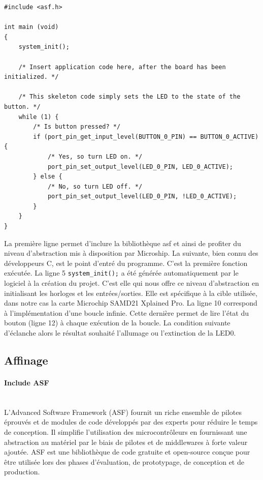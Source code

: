 \documentclass[a4paper]{article}
\begin{document}
\begin{lstlisting}[style=CStyle]
#include <asf.h>

int main (void)
{
	system_init();
	
	/* Insert application code here, after the board has been initialized. */
	
	/* This skeleton code simply sets the LED to the state of the button. */
	while (1) {
		/* Is button pressed? */
		if (port_pin_get_input_level(BUTTON_0_PIN) == BUTTON_0_ACTIVE) {
			/* Yes, so turn LED on. */
			port_pin_set_output_level(LED_0_PIN, LED_0_ACTIVE);
		} else {
			/* No, so turn LED off. */
			port_pin_set_output_level(LED_0_PIN, !LED_0_ACTIVE);
		}
	}
}
\end{lstlisting}
La première ligne permet d'inclure la  bibliothèque asf et ainsi de profiter du niveau d'abstraction mis à disposition par Microship. La suivante, bien connu des développeurs C, est le point d'entré du programme. C'est la première fonction exécutée. La ligne 5 \texttt{system\_init();} a été générée automatiquement par le logiciel à la création du projet. C'est elle qui nous offre ce niveau d'abstraction en initialisant les horloges et les entrées/sorties. Elle est spécifique à la cible utilisée, dans notre cas la carte Microchip SAMD21 Xplained Pro. La ligne 10 correspond à l'implémentation d'une boucle infinie. Cette dernière permet de lire l'état du bouton (ligne 12) à chaque exécution de la boucle. La condition suivante d’éclanche alors le résultat souhaité l'allumage ou l'extinction de la LED0.

\subsection{Affinage}

\paragraph{Include ASF}
~~\\
L'Advanced Software Framework (ASF) fournit un riche ensemble de pilotes éprouvés et de modules de code développés par des experts pour réduire le temps de conception. Il simplifie l'utilisation des microcontrôleurs en fournissant une abstraction au matériel par le biais de pilotes et de middlewares à forte valeur ajoutée. ASF est une bibliothèque de code gratuite et open-source conçue pour être utilisée lors des phases d'évaluation, de prototypage, de conception et de production. 
\end{document}
